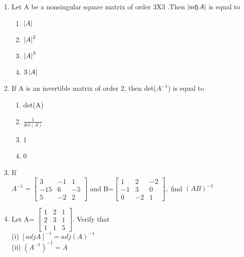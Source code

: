 \documentclass[journal,12pt,twocolumn]{IEEEtran}
\renewcommand\thesection{\arabic{section}}
\begin{document}
\begin{enumerate}[label=\thesection.\arabic*.,ref=\thesection.\theenumi]
\item Let A be a nonsingular square matrix of order 3X3 .Then $\left\vert adjA\right\vert$ is equal to 
\begin{enumerate}
\item $\left\vert A\right\vert$
\item $\left\vert A\right\vert^2$
\item $\left\vert A\right\vert^3$
\item $3\left\vert A\right\vert$
\end{enumerate}
\item If A is an invertible matrix of order 2, then det($A^{-1}$) is equal to 
\begin{enumerate}
\item det(A)
\item $\frac{1}{det(A)}$
\item 1
\item 0
\end{enumerate}
\item If \\
$A^{-1}=\begin{bmatrix}
3&-1&1 \\ -15&6&-5 \\5&-2&2
\end{bmatrix}$ and B=$\begin{bmatrix}
1&2&-2 \\ -1&3&0 \\0&-2&1
\end{bmatrix},$ find $(AB)^{-1}$\\
\item Let A=
$\begin{bmatrix}
1&2&1 \\ 2&3&1 \\1&1&5
\end{bmatrix}.$ Verify that \\
(i) $[adj A]^{-1}=adj(A)^{-1}$\\
(ii) $(A^{-1})^{-1}=A$\\
\end{enumerate}
\end{document}
